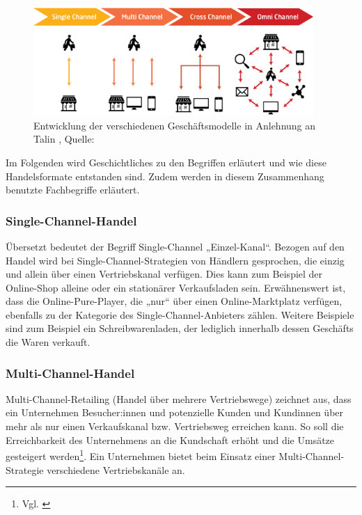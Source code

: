 \begin{figure}[!ht]
    \centering
    \includegraphics[width=0.95\textwidth,angle=0]{src/abbildungen/verkaufskanaele.png}
    \caption[Quelle: Multi-Channel, Omni-Channel oder Personalisierung, 2022]{Entwicklung der verschiedenen Geschäftsmodelle in Anlehnung an Talin , Quelle: \autocite {Talin2022}}
   \label{Onlineshopping_smartphone}
   \end{figure}
\newline

Im Folgenden wird Geschichtliches zu den Begriffen erläutert und wie diese Handelsformate entstanden sind. Zudem werden in diesem Zusammenhang benutzte Fachbegriffe erläutert.

\subsubsection{Single-Channel-Handel}\label{unterabschnitt_2_2_1}
Übersetzt bedeutet der Begriff Single-Channel „Einzel-Kanal“. Bezogen auf den Handel wird bei Single-Channel-Strategien von Händlern gesprochen, die einzig und allein über einen Vertriebskanal verfügen. Dies kann zum Beispiel der Online-Shop alleine oder ein stationärer Verkaufsladen sein. Erwähnenswert ist, dass die Online-Pure-Player, die „nur“ über einen Online-Marktplatz verfügen, ebenfalls zu der Kategorie des Single-Channel-Anbieters zählen. Weitere Beispiele sind zum Beispiel ein Schreibwarenladen, der lediglich innerhalb dessen Geschäfts die Waren verkauft.


\subsubsection{Multi-Channel-Handel}\label{unterabschnitt_2_2_2}
Multi-Channel-Retailing (Handel über mehrere Vertriebswege) zeichnet aus, dass ein Unternehmen Besucher:innen und potenzielle Kunden und Kundinnen über mehr als nur einen Verkaufskanal bzw. Vertriebsweg erreichen kann. So soll die Erreichbarkeit des Unternehmens an die Kundschaft erhöht und die Umsätze gesteigert werden\footnote{Vgl. \autocite [S.20] {Wirtz2022}}.
Ein Unternehmen bietet beim Einsatz einer Multi-Channel-Strategie verschiedene Vertriebskanäle an.
\newline

